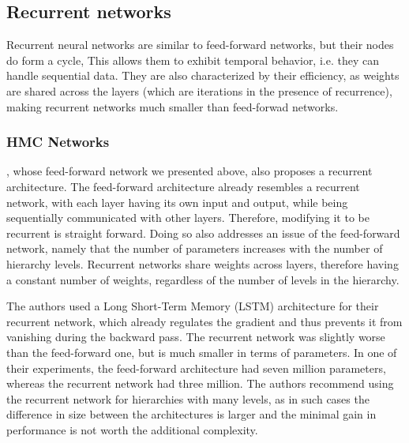 \subsection{Recurrent networks}

Recurrent neural networks are similar to feed-forward networks, but their nodes do form a cycle, This allows them to exhibit temporal behavior, i.e. they can handle sequential data. They are also characterized by their efficiency, as weights are shared across the layers (which are iterations in the presence of recurrence), making recurrent networks much smaller than feed-forwad networks.

\subsubsection{HMC Networks}

\cite{wehrmann2018hierarchical}, whose feed-forward network we presented above, also proposes a recurrent architecture. The feed-forward architecture already resembles a recurrent network, with each layer having its own input and output, while being sequentially communicated with other layers. Therefore, modifying it to be recurrent is straight forward. Doing so also addresses an issue of the feed-forward network, namely that the number of parameters increases with the number of hierarchy levels. Recurrent networks share weights across layers, therefore having a constant number of weights, regardless of the number of levels in the hierarchy.

The authors used a Long Short-Term Memory (LSTM) architecture for their recurrent network, which already regulates the gradient and thus prevents it from vanishing during the backward pass. The recurrent network was slightly worse than the feed-forward one, but is much smaller in terms of parameters. In one of their experiments, the feed-forward architecture had seven million parameters, whereas the recurrent network had three million. The authors recommend using the recurrent network for hierarchies with many levels, as in such cases the difference in size between the architectures is larger and the minimal gain in performance is not worth the additional complexity.
